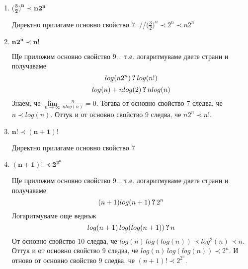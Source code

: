 \begin{solution}
\begin{enumerate}[label=\textbf{\arabic*.}]
		
		\vspace{0.2cm}
		\item $\bm{\big(\frac{3}{2}\big)^n\prec n2^n}$
		
		Директно прилагаме основно свойство $\hyperref[mprop-1]{7}$. //$\big(\frac{3}{2}\big)^n\prec 2^n\prec n2^n$
		
		
		\vspace{0.2cm}
		\item $\bm{n2^n\prec n!}$
		
		Ще приложим основно свойство $\hyperref[mprop-1]{9}\dots$ т.е. логаритмуваме двете страни и получаваме
		\begin{equation*}
			log(n2^n)\,\textbf?\,log(n!)
		\end{equation*}
		\begin{equation*}
			log(n)+nlog(2)\,\textbf?\,nlog(n)
		\end{equation*}
		Знаем, че $\lim\limits_{n\to\infty}\frac n{nlog(n)}=0$. Тогава от основно свойство $\hyperref[mprop-1]{7}$ следва, че $n\prec log(n)$. Оттук и от основно свойство $\hyperref[mprop-1]{9}$ следва, че $n2^n\prec n!$.
	
	
		\vspace{0.2cm}
		\item $\bm{n!\prec (n+1)!}$

		Директно прилагаме основно свойство $\hyperref[mprop-1]{7}$
		
		
		\vspace{0.2cm}
		\item $\bm{(n+1)!\prec2^{2^n}}$
		
		Ще приложим основно свойство $\hyperref[mprop-1]{9}\dots$ т.е. логаритмуваме двете страни и получаваме
		\begin{equation*}
			(n+1)log(n+1)\,\textbf?\,2^n
		\end{equation*}
		Логаритмуваме още веднъж
		\begin{equation*}
			log(n+1)\,log(log(n+1))\,\textbf?\,n
		\end{equation*}
		От основно свойство $\hyperref[mprop-1]{10}$ следва, че $log(n)\,log(log(n))\prec log^2(n)\prec n$. Оттук и от основно свойство $\hyperref[mprop-1]{9}$ следва, че $log(n)\,log(log(n))\prec2^n$. И отново от основно свойство $\hyperref[mprop-1]{9}$ следва, че $(n+1)!\prec2^{2^n}$.
	\end{enumerate}
\end{solution}